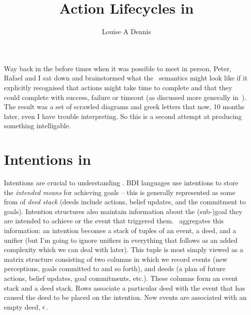 \documentclass{blue-book}
\title{Action Lifecycles in \gwendolen}
\author{Louise A Dennis}
\begin{document}
\maketitle

Way back in the before times when it was possible to meet in person, Peter, Rafael and I sat down and brainstormed what the \gwendolen\ semantics might look like if it explicitly recognised that actions might take time to complete and that they could complete with success, failure or timeout (as discussed more generally in~\cite{dennis14,dennis14:_action_durat_failur_bdi_languag}).  The result was a set of scrawled diagrams and greek letters that now, 10 months later, even I have trouble interpreting.  So this is a second attempt at producing something intelligable.

\section{Intentions in \gwendolen}
\label{sec:intentions}

Intentions are crucial to understanding \gwendolen.  BDI languages use intentions to
store the \emph{intended means} for achieving goals -- this is
generally represented as some from of {\em deed stack} (deeds include
actions, belief updates, and the commitment to
goals).  Intention structures 
also maintain information about the (sub-)goal they are intended to
achieve or the event that triggered them. \gwendolen\ aggregates
this information: an intention becomes a stack of tuples of an
event, a deed, and a
unifier (but I'm going to ignore unifiers in everything that follows as an added complexity which we can deal with later).  This tuple is most
simply viewed as a matrix structure consisting of two columns in
which we record events (new perceptions, goals committed to and so
forth),  and deeds (a plan of future actions, belief updates, goal
commitments, etc.). These columns form an event stack and a deed
stack.  Rows associate a
particular deed with the event that has caused the deed to be placed
on the intention. New events are associated with an empty
deed, $\epsilon$.
\end{document}
